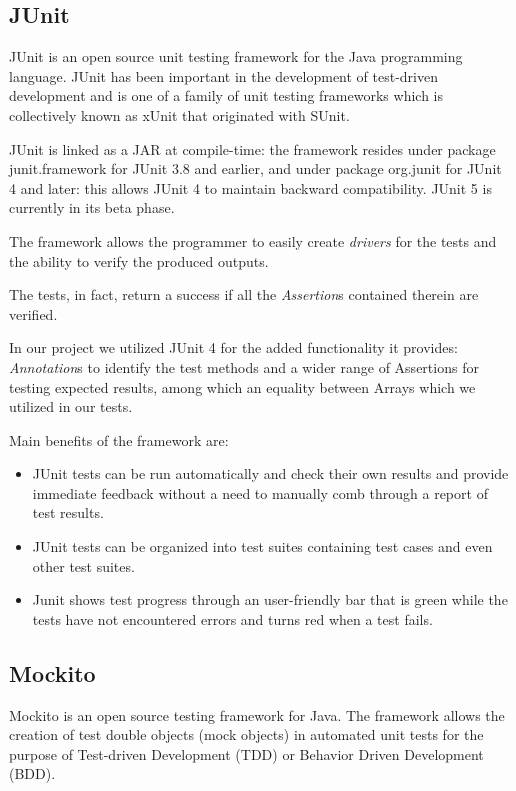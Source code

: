 \documentclass{beamer}
\begin{document}
\subsection{JUnit}

JUnit is an open source unit testing framework for the Java programming language. JUnit has been important in the development of test-driven development and is one of a family of unit testing frameworks which is collectively known as xUnit that originated with SUnit.

JUnit is linked as a JAR at compile-time: the framework resides under package junit.framework for JUnit 3.8 and earlier, and under package org.junit for JUnit 4 and later: this allows JUnit 4 to maintain backward compatibility.
JUnit 5 is currently in its beta phase.

The framework allows the programmer to easily create \textit{drivers} for the tests and the ability to verify the produced outputs. 

The tests, in fact, return a success if all the \textit{Assertion}s contained therein are verified.

In our project we utilized JUnit 4 for the added functionality it provides: \textit{Annotation}s to identify the test methods and a wider range of Assertions for testing expected results, among which an equality between Arrays which we utilized in our tests.

Main benefits of the framework are: \begin{itemize}
	\item JUnit tests can be run automatically and check their own results and provide immediate feedback without a need to manually comb through a report of test results.
	
	\item JUnit tests can be organized into test suites containing test cases and even other test suites.
	
	\item Junit shows test progress through an user-friendly bar that is green while the tests have not encountered errors and turns red when a test fails.
	
\end{itemize}


\subsection{Mockito}

Mockito is an open source testing framework for Java. The framework allows the creation of test double objects (mock objects) in automated unit tests for the purpose of Test-driven Development (TDD) or Behavior Driven Development (BDD).
\end{document}
